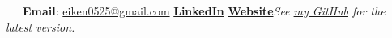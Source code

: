 \documentclass[letterpaper, 11pt]{article}
\begin{document}


\vspace{0.5cm} 
\noindent\:\ \ \ \textbf{Email}: \href{mailto:eiken0525@gmail.com}{eiken0525@gmail.com} \qquad \quad \href{https://www.linkedin.com/in/eiken59}{\textbf{LinkedIn}} \qquad \quad \href{https://sites.google.com/view/eiken59/}{\textbf{Website}}\hfill \textit{\footnotesize See \href{https://github.com/eiken59/CV/blob/main/eiken59_CV.pdf}{my GitHub} for the latest version.\ \ \ \ \,}


\setlength{\tabcolsep}{8pt}
\vspace{-1.5em}
\end{document}
